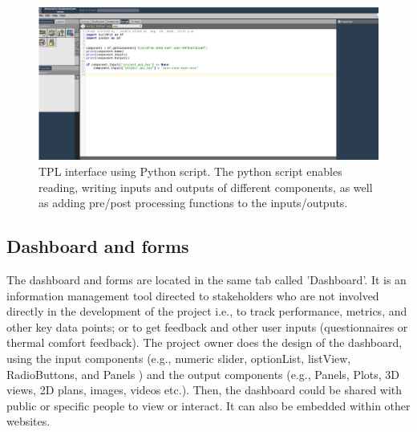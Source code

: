 \documentclass{scsSimAUDPaperFormat}
\begin{document}
\begin{figure}[h]
\centering
\includegraphics[width=\columnwidth]{imgs/tpl_interface.png}
\caption{TPL interface using Python script. The python script enables reading, writing inputs and outputs of different components, as well as adding pre/post processing functions to the inputs/outputs.}
\label{fig:tpl_interface}
\end{figure}
\subsection{Dashboard and forms}

\label{sec:applicationlayer}
The dashboard and forms are located in the same tab called 'Dashboard'. It is an information management tool directed to stakeholders who are not involved directly in the development of the project i.e., to track performance, metrics, and other key data points; or to get feedback and other user inputs (questionnaires or thermal comfort feedback). The project owner does the design of the dashboard, using the input components (e.g., numeric slider, optionList, listView, RadioButtons, and  Panels ) and the output components (e.g., Panels, Plots, 3D views, 2D plans, images, videos etc.). Then, the dashboard could be shared with public or specific people to view or interact. It can also be embedded within other websites.
\end{document}
